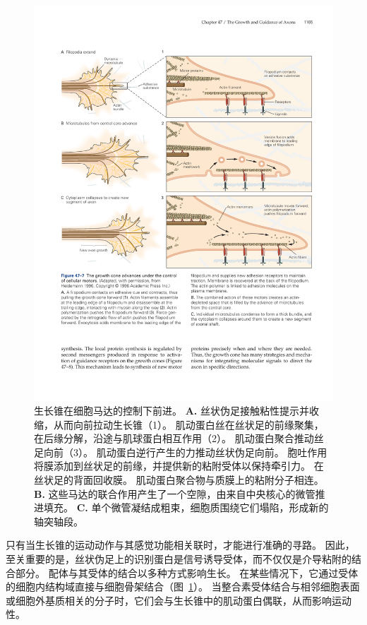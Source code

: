 \begin{figure}[htbp]
	\centering
	\includegraphics[width=0.95\linewidth]{chap47/fig_47_7}
	\caption{生长锥在细胞马达的控制下前进\cite{heidemann1996cytoplasmic}。
		\textbf{A.} 丝状伪足接触粘性提示并收缩，从而向前拉动生长锥（1）。
		肌动蛋白丝在丝状足的前缘聚集，在后缘分解，沿途与肌球蛋白相互作用（2）。
		肌动蛋白聚合推动丝足向前（3）。
		肌动蛋白逆行产生的力推动丝状伪足向前。
		胞吐作用将膜添加到丝状足的前缘，并提供新的粘附受体以保持牵引力。
		在丝状足的背面回收膜。
		肌动蛋白聚合物与质膜上的粘附分子相连。
		\textbf{B.} 这些马达的联合作用产生了一个空隙，由来自中央核心的微管推进填充。
		\textbf{C.} 单个微管凝结成粗束，细胞质围绕它们塌陷，形成新的轴突轴段。}
	\label{fig:47_7}
\end{figure}


只有当生长锥的运动动作与其感觉功能相关联时，才能进行准确的寻路。
因此，至关重要的是，丝状伪足上的识别蛋白是信号诱导受体，而不仅仅是介导粘附的结合部分。
配体与其受体的结合以多种方式影响生长。
在某些情况下，它通过受体的细胞内结构域直接与细胞骨架结合（图~\ref{fig:47_7}）。
当整合素受体结合与相邻细胞表面或细胞外基质相关的分子时，它们会与生长锥中的肌动蛋白偶联，从而影响运动性。


